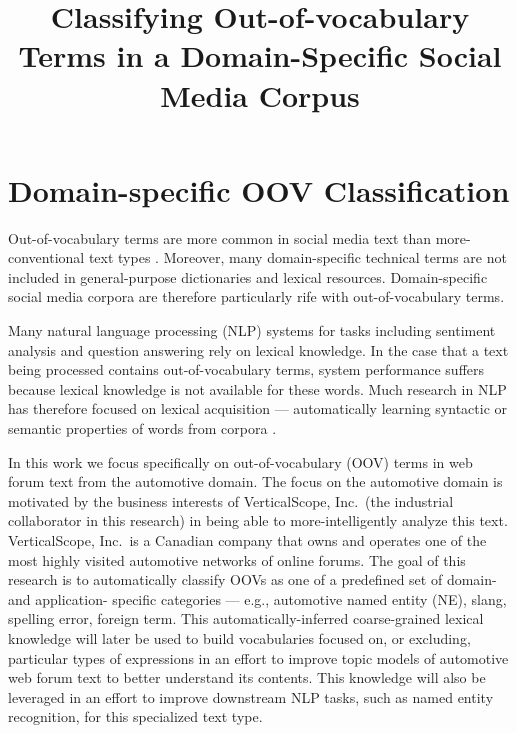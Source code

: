 \documentclass[10pt, a4paper]{article}
\title{Classifying Out-of-vocabulary Terms in a Domain-Specific Social
  Media Corpus}
\begin{document}
\maketitleabstract

\section{Domain-specific OOV Classification}

Out-of-vocabulary terms are more common in social media text than
more-conventional text types \cite{Baldwin+:2013a}.
Moreover, many domain-specific technical terms
are not included in general-purpose dictionaries and lexical
resources. Domain-specific social media corpora are therefore
particularly rife with out-of-vocabulary terms.

Many natural language processing (NLP) systems for tasks including
sentiment analysis and question answering rely on lexical
knowledge. In the case that a text being processed contains
out-of-vocabulary terms, system performance suffers because lexical
knowledge is not available for these words. Much research in NLP has
therefore focused on lexical acquisition --- automatically learning
syntactic or semantic properties of words from corpora
\cite[for example]{Hearst1992,Lin1998,Turney2003}.



In this work we focus specifically on out-of-vocabulary (OOV) terms in
web forum text from the automotive domain. The focus on the automotive
domain is motivated by the business interests of VerticalScope,
Inc.\ (the industrial collaborator in this research) in being able to
more-intelligently analyze this text. VerticalScope, Inc.\ is a
Canadian company that owns and operates one of the most highly visited
automotive networks of online forums. The goal of this research is to
automatically classify OOVs as one of a predefined set of domain- and
application- specific categories --- e.g., automotive named entity
(NE), slang, spelling error, foreign term. This automatically-inferred
coarse-grained lexical knowledge will later be used to build
vocabularies focused on, or excluding, particular types of expressions
in an effort to improve topic models \cite[for example]{Blei2003} of
automotive web forum text to better understand its contents. This
knowledge will also be leveraged in an effort to improve downstream
NLP tasks, such as named entity recognition, for this specialized text
type.
\end{document}
